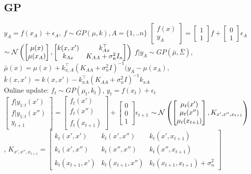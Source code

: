\subsection{GP}
$y_{A}=f(x_{A})+\epsilon_{A},\ f\sim GP(\mu, k), A=\{1,..n\}$
$\begin{bmatrix} f(x) \\ y_{A}\end{bmatrix} = \begin{bmatrix} 1 \\ 1\end{bmatrix} f + \begin{bmatrix} 0 \\ 1 \end{bmatrix}\epsilon_{A}$
$\sim \mathcal{N}\left(\begin{bmatrix} \mu(x) \\ \mu(x_{A})\end{bmatrix},
    \begin{bmatrix} k(x,x') & k_{Ax}^{\top} \\ k_{Ax} & K_{AA}+\sigma_{n}^{2}I_{n}\end{bmatrix}\right)$
$f|y_{A} \sim GP(\bar{\mu}, \bar{\Sigma})$,
$\bar{\mu}(x) = \mu(x) + k_{x,A}^{\top}(K_{AA}+\sigma_{n}^{2}I)^{-1}(y_{A}-\mu(x_{A})$,
$\bar{k}(x,x')= k(x,x')-k_{xA}^{\top}(K_{AA}+\sigma_{n}^{2}I)^{-1}k_{xA}$\\
Online update:
$f_{t} \sim GP(\mu_{t}, k_{t})$, $y_{t}=f(x_{t})+\epsilon_{t}$
$\begin{bmatrix} f|y_{1:t}(x') \\ f|y_{1:t}(x'')\\ y_{t+1}\end{bmatrix} =
\begin{bmatrix} f_{t}(x') \\ f_{t}(x'') \\ f_{t}(x_{t+1}) \end{bmatrix} +
\begin{bmatrix} 0 \\ 0 \\ 1 \end{bmatrix}\epsilon_{t+1}$
$\sim \mathcal{N}\left(\begin{bmatrix} \mu_{t}(x') \\ \mu_{t}(x'') \\ \mu_{t}(x_{t+1}) \end{bmatrix}, K_{x',x'',x_{t+1}}\right)$,
$K_{x',x'',x_{t+1}} = \begin{bmatrix} k_{t}(x',x') & k_{t}(x',x'') & k_{t}(x',x_{t+1})\\
    k_{t}(x',x'') & k_{t}(x'',x'') & k_{t}(x'',x_{t+1}) \\
    k_{t}(x_{t+1},x') & k_{t}(x_{t+1},x'') & k_{t}(x_{t+1},x_{t+1})+\sigma_{n}^{2}\end{bmatrix}$



